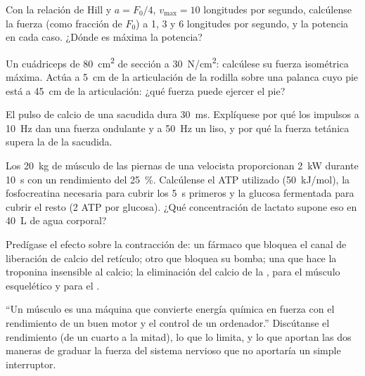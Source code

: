 \begin{exercise}[$\star\star$]\label{exo:b2:muscle-movement:7}
Con la relación de Hill y $a = F_0/4$, $v_{\max} = 10$ longitudes por
segundo, calcúlense la fuerza (como fracción de $F_0$) a 1, 3 y 6
longitudes por segundo, y la potencia en cada caso. ¿Dónde es máxima la
potencia?
\end{exercise}

\begin{exercise}[$\star\star$]\label{exo:b2:muscle-movement:8}
Un cuádriceps de \qty{80}{cm^2} de sección a \qty{30}{N/cm^2}: calcúlese su
fuerza isométrica máxima. Actúa a \qty{5}{cm} de la articulación de la
rodilla sobre una palanca cuyo pie está a \qty{45}{cm} de la articulación:
¿qué fuerza puede ejercer el pie?
\end{exercise}

\begin{exercise}[$\star\star$]\label{exo:b2:muscle-movement:9}
El pulso de calcio de una sacudida dura \qty{30}{ms}. Explíquese por qué
los impulsos a \qty{10}{Hz} dan una fuerza ondulante y a \qty{50}{Hz} un
 liso, y por qué la fuerza tetánica supera la de la sacudida.
\end{exercise}

\begin{exercise}[$\star\star\star$]\label{exo:b2:muscle-movement:10}
Los \qty{20}{kg} de músculo de las piernas de una velocista proporcionan
\qty{2}{kW} durante \qty{10}{s} con un rendimiento del \qty{25}{\%}.
Calcúlense el ATP utilizado (\qty{50}{kJ/mol}), la fosfocreatina necesaria
para cubrir los \qty{5}{s} primeros y la glucosa fermentada para cubrir el
resto (2 ATP por glucosa). ¿Qué concentración de lactato supone eso en
\qty{40}{L} de agua corporal?
\end{exercise}

\begin{exercise}[$\star\star\star$]\label{exo:b2:muscle-movement:11}
Predígase el efecto sobre la contracción de: un fármaco que bloquea el
canal de liberación de calcio del retículo; otro que bloquea su bomba; una
 que hace la troponina insensible al calcio; la eliminación del
calcio de la , para el músculo esquelético y para el .
\end{exercise}

\begin{exercise}[$\star\star\star$]\label{exo:b2:muscle-movement:12}
``Un músculo es una máquina que convierte energía química en fuerza con el
rendimiento de un buen motor y el control de un ordenador.'' Discútanse el
rendimiento (de un cuarto a la mitad), lo que lo limita, y lo que aportan
las dos maneras de graduar la fuerza del sistema nervioso que no aportaría
un simple interruptor.
\end{exercise}

